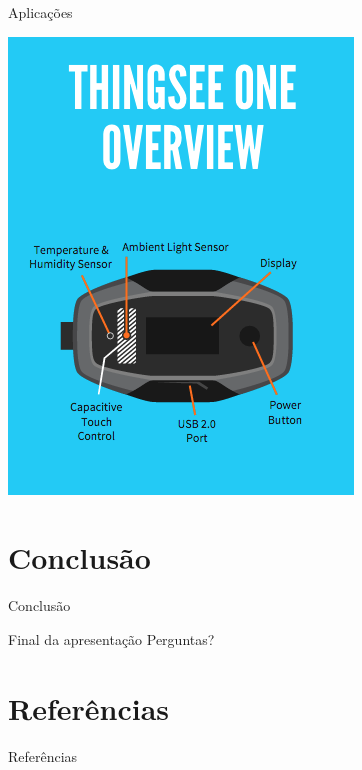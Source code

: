 \documentclass[aspectratio=169]{beamer}
\begin{document}
\begin{frame}{Aplicações}
\begin{minipage}{0.5\textwidth}
\begin{overprint}
	\centering\includegraphics[width=0.70\linewidth]{thingsee.png}
  \end{overprint}
\end{minipage}

\end{frame}

\section{Conclusão}
\begin{frame}{Conclusão}

\begin{block}{Final da apresentação}
	Perguntas?
\end{block}

\end{frame}

\section{Referências}


\begin{frame}[allowframebreaks]{Referências}

\end{frame}

\end{document}
